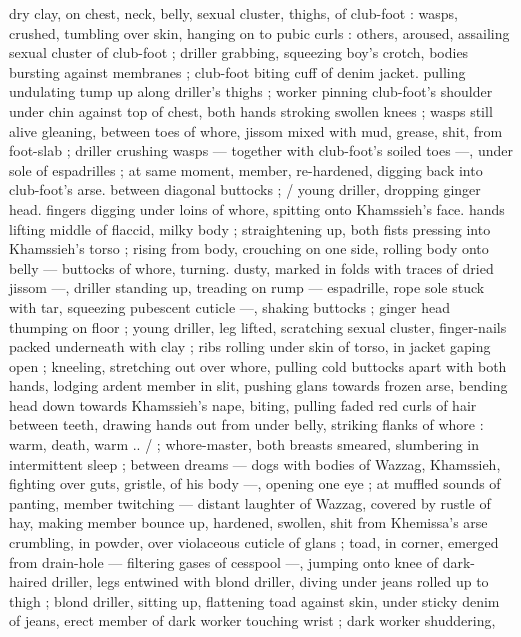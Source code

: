{dry clay, on chest, neck, belly, sexual cluster, thighs, of club-foot : 
wasps, crushed, tumbling over skin, hanging on to pubic curls : 
others, aroused, assailing sexual cluster of club-foot ; driller 
grabbing, squeezing boy's crotch, bodies bursting against 
membranes ; club-foot biting cuff of denim jacket. pulling undulating 
tump up along driller's thighs ; worker pinning club-foot's shoulder 
under chin against top of chest, both hands stroking swollen knees 
; wasps still alive gleaning, between toes of whore, jissom mixed with 
mud, grease, shit, from foot-slab ; driller crushing wasps --- together 
with club-foot's soiled toes ---, under sole of espadrilles ; at same 
moment, member, re-hardened, digging back into club-foot's arse. 
between diagonal buttocks ; {\slash} young driller, dropping ginger head. 
fingers digging under loins of whore, spitting onto Khamssieh's face. 
hands lifting middle of flaccid, milky body ; straightening up, both 
fists pressing into Khamssieh's torso ; rising from body, crouching on 
one side, rolling body onto belly --- buttocks of whore, turning. 
dusty, marked in folds with traces of dried jissom ---, driller standing 
up, treading on rump --- espadrille, rope sole stuck with tar, 
squeezing pubescent cuticle ---, shaking buttocks ; ginger head 
thumping on floor ; young driller, leg lifted, scratching sexual cluster, 
finger-nails packed underneath with clay ; ribs rolling under skin of 
torso, in jacket gaping open ; kneeling, stretching out over whore, 
pulling cold buttocks apart with both hands, lodging ardent member 
in slit, pushing glans towards frozen arse, bending head down 
towards Khamssieh's nape, biting, pulling faded red curls of hair 
between teeth, drawing hands out from under belly, striking flanks of 
whore : {\gl}{\td} warm, death, warm ..{\gr} {\slash} ; whore-master, both breasts 
smeared, slumbering in intermittent sleep ; between dreams --- dogs 
with bodies of Wazzag, Khamssieh, fighting over guts, gristle, of his 
body ---, opening one eye ; at muffled sounds of panting, member 
twitching --- distant laughter of Wazzag, covered by rustle of hay, 
making member bounce up, hardened, swollen, shit from Khemissa's 
arse crumbling, in powder, over violaceous cuticle of glans ; toad, in 
corner, emerged from drain-hole --- filtering gases of cesspool ---, 
jumping onto knee of dark-haired driller, legs entwined with blond 
driller, diving under jeans rolled up to thigh ; blond driller, sitting up, 
flattening toad against skin, under sticky denim of jeans, erect 
member of dark worker touching wrist ; dark worker shuddering, 
}
